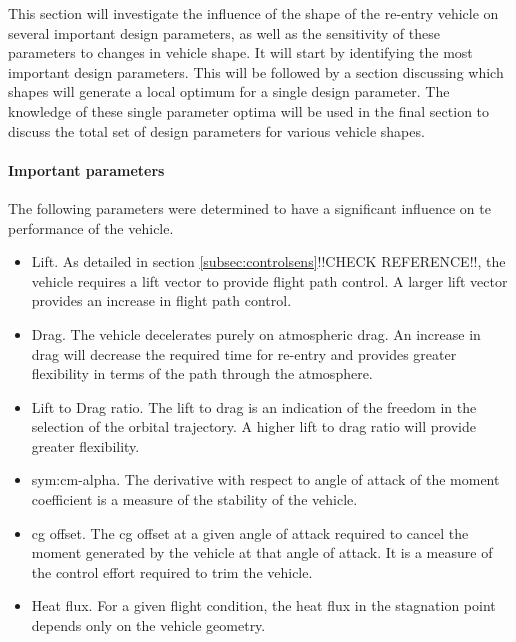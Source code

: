 This section will investigate the influence of the shape of the re-entry vehicle on several important design parameters, as well as the sensitivity of these parameters to changes in vehicle shape. It will start by identifying the most important design parameters. This will be followed by a section discussing which shapes will generate a local optimum for a single design parameter. The knowledge of these single parameter optima will be used in the final section to discuss the total set of design parameters for various vehicle shapes. 


\paragraph{Important parameters}
 The following parameters were determined to have a significant influence on te performance of the vehicle.


\begin{itemize}
	\item{Lift. As detailed in section \ref{subsec:controlsens}!!CHECK REFERENCE!!, the vehicle requires a lift vector to provide flight path control. A larger lift vector provides an increase in flight path control.}
	\item{Drag. The vehicle decelerates purely on atmospheric drag. An increase in drag will decrease the required time for re-entry and provides greater flexibility in terms of the path through the atmosphere. }
	\item{Lift to Drag ratio. The lift to drag is an indication of the freedom in the selection of the orbital trajectory. A higher lift to drag ratio will provide greater flexibility.}
	\item{\gls{sym:cm-alpha}. The derivative with respect to angle of attack of the moment coefficient is a measure of the stability of the vehicle. }
	\item{\gls{cg} offset}. The \gls{cg} offset at a given angle of attack required to cancel the moment generated by the vehicle at that angle of attack. It is a measure of the control effort required to trim the vehicle. 
	\item{Heat flux. For a given flight condition, the heat flux in the stagnation point depends only on the vehicle geometry.  }
\end{itemize}


